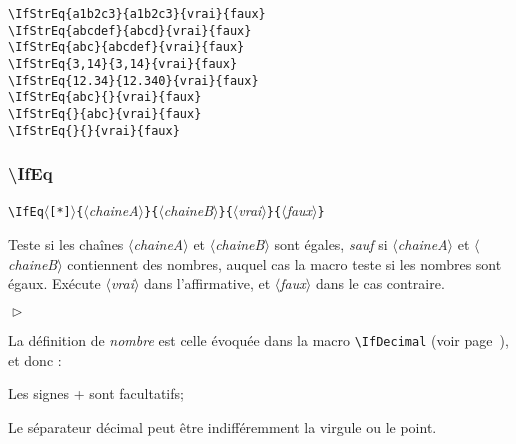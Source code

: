 \documentclass[a4paper,10pt]{article}
\newcommand\guill[1]{\og{}#1\fg{}}
\newcommand\argu[1]{$\langle$\textit{#1}$\rangle$}
\newcommand\ARGU[1]{\texttt{\color{black}\{}\argu{#1}\texttt{\color{black}\}}}
\newcommand\etoile{$\langle$\texttt{[*]}$\rangle$}
\newenvironment{Conditions}[1][1cm]%
{\begin{list}%
	{$\vartriangleright$}%
	{\setlength{\leftmargin}{#1}
	 \setlength{\itemsep}{0pt}
	 \setlength{\parsep}{0pt}
	 \setlength{\topsep}{2ptplus3ptminus2pt}
	}}%
{\end{list}}
\newcommand\styleexemple{\small\vskip4pt}
\newcommand\verbinline{\lstinline[basicstyle=\normalsize\ttfamily]}
\begin{document}
\begin{minipage}[t]{0.65\linewidth}
\begin{lstlisting}
\IfStrEq{a1b2c3}{a1b2c3}{vrai}{faux}
\IfStrEq{abcdef}{abcd}{vrai}{faux}
\IfStrEq{abc}{abcdef}{vrai}{faux}
\IfStrEq{3,14}{3,14}{vrai}{faux}
\IfStrEq{12.34}{12.340}{vrai}{faux}
\IfStrEq{abc}{}{vrai}{faux}
\IfStrEq{}{abc}{vrai}{faux}
\IfStrEq{}{}{vrai}{faux}
\end{lstlisting}%
\end{minipage}\hfill
\begin{minipage}[t]{0.35\linewidth}
	\styleexemple
	\par
	\par
	\par
	\par
	\par
	\par
	\par
\end{minipage}%

\subsubsection{\ttfamily\textbackslash IfEq}
\verbinline|\IfEq|\etoile\ARGU{chaineA}\ARGU{chaineB}\ARGU{vrai}\ARGU{faux}
\smallskip

Teste si les chaînes \argu{chaineA} et \argu{chaineB} sont égales, \emph{sauf} si \argu{chaineA} et \argu{chaineB} contiennent des nombres, auquel cas la macro teste si les nombres sont égaux. Exécute \argu{vrai} dans l'affirmative, et \argu{faux} dans le cas contraire.\smallskip

\begin{Conditions}
	\item La définition de \emph{nombre} est celle évoquée dans la macro \verbinline|\IfDecimal| (voir page~\pageref{ifdecimal}), et donc :
	\item Les signes \guill{+} sont facultatifs;
	\item Le séparateur décimal peut être indifféremment la virgule ou le point.
\end{Conditions}
\end{document}
